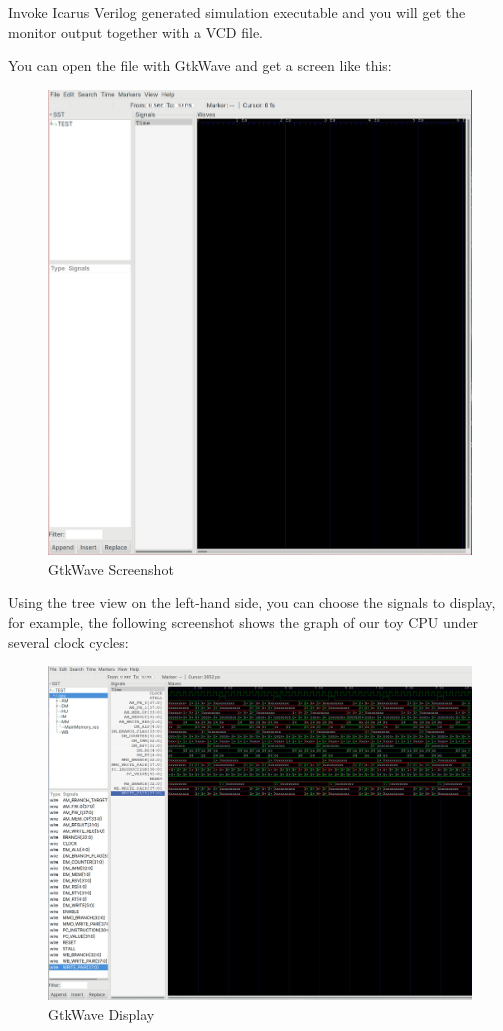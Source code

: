 \documentclass[a4paper,12pt, oneside]{book}
\begin{document}
Invoke Icarus Verilog generated simulation executable and you will get the monitor output together with a VCD file.

You can open the file with GtkWave and get a screen like this:
\begin{figure}[H]
	\centering
	\includegraphics[scale=0.18]{gtkwave0}
	\caption{GtkWave Screenshot}
\end{figure}

Using the tree view on the left-hand side, you can choose the signals to display, for example, the following screenshot shows the graph of our toy CPU under several clock cycles:

\begin{figure}[H]
	\centering
	\includegraphics[width=\linewidth]{gtkwave1}
	\caption{GtkWave Display}
\end{figure}
\end{document}
